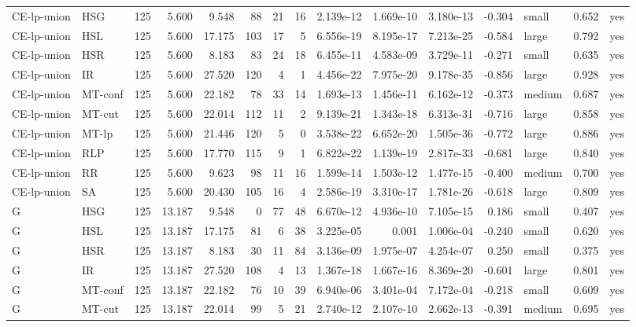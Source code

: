 \begin{table}[htbp]
\begin{tabular}{llrrrrrrrrrrlrr}
CE-lp-union & HSG & 125 & 5.600 & 9.548 & 88 & 21 & 16 & 2.139e-12 & 1.669e-10 & 3.180e-13 & -0.304 & small & 0.652 & yes \\
CE-lp-union & HSL & 125 & 5.600 & 17.175 & 103 & 17 & 5 & 6.556e-19 & 8.195e-17 & 7.213e-25 & -0.584 & large & 0.792 & yes \\
CE-lp-union & HSR & 125 & 5.600 & 8.183 & 83 & 24 & 18 & 6.455e-11 & 4.583e-09 & 3.729e-11 & -0.271 & small & 0.635 & yes \\
CE-lp-union & IR & 125 & 5.600 & 27.520 & 120 & 4 & 1 & 4.456e-22 & 7.975e-20 & 9.178e-35 & -0.856 & large & 0.928 & yes \\
CE-lp-union & MT-conf & 125 & 5.600 & 22.182 & 78 & 33 & 14 & 1.693e-13 & 1.456e-11 & 6.162e-12 & -0.373 & medium & 0.687 & yes \\
CE-lp-union & MT-cut & 125 & 5.600 & 22.014 & 112 & 11 & 2 & 9.139e-21 & 1.343e-18 & 6.313e-31 & -0.716 & large & 0.858 & yes \\
CE-lp-union & MT-lp & 125 & 5.600 & 21.446 & 120 & 5 & 0 & 3.538e-22 & 6.652e-20 & 1.505e-36 & -0.772 & large & 0.886 & yes \\
CE-lp-union & RLP & 125 & 5.600 & 17.770 & 115 & 9 & 1 & 6.822e-22 & 1.139e-19 & 2.817e-33 & -0.681 & large & 0.840 & yes \\
CE-lp-union & RR & 125 & 5.600 & 9.623 & 98 & 11 & 16 & 1.599e-14 & 1.503e-12 & 1.477e-15 & -0.400 & medium & 0.700 & yes \\
CE-lp-union & SA & 125 & 5.600 & 20.430 & 105 & 16 & 4 & 2.586e-19 & 3.310e-17 & 1.781e-26 & -0.618 & large & 0.809 & yes \\
G & HSG & 125 & 13.187 & 9.548 & 0 & 77 & 48 & 6.670e-12 & 4.936e-10 & 7.105e-15 & 0.186 & small & 0.407 & yes \\
G & HSL & 125 & 13.187 & 17.175 & 81 & 6 & 38 & 3.225e-05 & 0.001 & 1.006e-04 & -0.240 & small & 0.620 & yes \\
G & HSR & 125 & 13.187 & 8.183 & 30 & 11 & 84 & 3.136e-09 & 1.975e-07 & 4.254e-07 & 0.250 & small & 0.375 & yes \\
G & IR & 125 & 13.187 & 27.520 & 108 & 4 & 13 & 1.367e-18 & 1.667e-16 & 8.369e-20 & -0.601 & large & 0.801 & yes \\
G & MT-conf & 125 & 13.187 & 22.182 & 76 & 10 & 39 & 6.940e-06 & 3.401e-04 & 7.172e-04 & -0.218 & small & 0.609 & yes \\
G & MT-cut & 125 & 13.187 & 22.014 & 99 & 5 & 21 & 2.740e-12 & 2.107e-10 & 2.662e-13 & -0.391 & medium & 0.695 & yes \\

\end{tabular}
\end{table}

